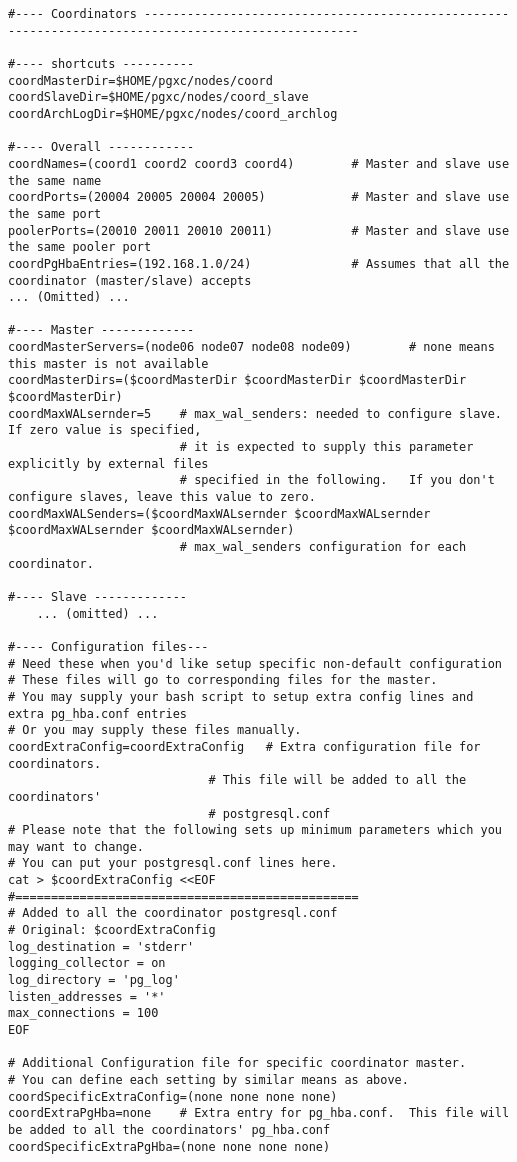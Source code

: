   \begin{lstlisting}[frame=single, basicstyle=\ttfamily\tiny]
#---- Coordinators ----------------------------------------------------------------------------------------------------

#---- shortcuts ----------
coordMasterDir=$HOME/pgxc/nodes/coord
coordSlaveDir=$HOME/pgxc/nodes/coord_slave
coordArchLogDir=$HOME/pgxc/nodes/coord_archlog

#---- Overall ------------
coordNames=(coord1 coord2 coord3 coord4)        # Master and slave use the same name
coordPorts=(20004 20005 20004 20005)            # Master and slave use the same port
poolerPorts=(20010 20011 20010 20011)           # Master and slave use the same pooler port
coordPgHbaEntries=(192.168.1.0/24)              # Assumes that all the coordinator (master/slave) accepts
... (Omitted) ...

#---- Master -------------
coordMasterServers=(node06 node07 node08 node09)        # none means this master is not available
coordMasterDirs=($coordMasterDir $coordMasterDir $coordMasterDir $coordMasterDir)
coordMaxWALsernder=5    # max_wal_senders: needed to configure slave. If zero value is specified,
                        # it is expected to supply this parameter explicitly by external files
	                    # specified in the following.   If you don't configure slaves, leave this value to zero.
coordMaxWALSenders=($coordMaxWALsernder $coordMaxWALsernder $coordMaxWALsernder $coordMaxWALsernder)
                        # max_wal_senders configuration for each coordinator.

#---- Slave -------------
	... (omitted) ...

#---- Configuration files---
# Need these when you'd like setup specific non-default configuration 
# These files will go to corresponding files for the master.
# You may supply your bash script to setup extra config lines and extra pg_hba.conf entries 
# Or you may supply these files manually.
coordExtraConfig=coordExtraConfig   # Extra configuration file for coordinators.  
	                        # This file will be added to all the coordinators'
	                        # postgresql.conf
# Please note that the following sets up minimum parameters which you may want to change.
# You can put your postgresql.conf lines here.
cat > $coordExtraConfig <<EOF
#================================================
# Added to all the coordinator postgresql.conf
# Original: $coordExtraConfig
log_destination = 'stderr'
logging_collector = on
log_directory = 'pg_log'
listen_addresses = '*'
max_connections = 100
EOF

# Additional Configuration file for specific coordinator master.
# You can define each setting by similar means as above.
coordSpecificExtraConfig=(none none none none)
coordExtraPgHba=none    # Extra entry for pg_hba.conf.  This file will be added to all the coordinators' pg_hba.conf
coordSpecificExtraPgHba=(none none none none)
  \end{lstlisting}
  
